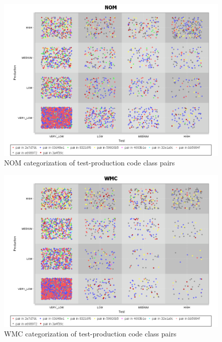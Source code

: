 \begin{figure}
    \centering
    \includegraphics[width=\linewidth]{resources/NOM.pdf}
    \caption{NOM categorization of test-production code class pairs}
    \label{figure:nom}
\end{figure}
\begin{figure}
    \centering
    \includegraphics[width=\linewidth]{resources/WMC.pdf}
    \caption{WMC categorization of test-production code class pairs}
    \label{subfigure:wmc}
\end{figure}


